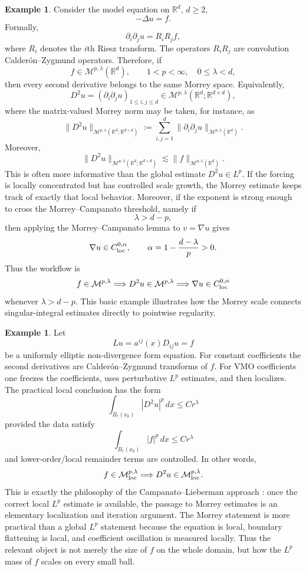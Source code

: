 \documentclass[11pt]{article}
\theoremstyle{definition}
\newtheorem{example}[theorem]{Example}
\newcommand{\R}{\mathbb R}
\begin{document}
\begin{example}\label{ex:poisson-morrey-cz}
Consider the model equation on $\R^d$, $d\ge2$,
\[
        -\Delta u=f .
\]
Formally,
\[
        \partial_i\partial_j u = R_iR_j f,
\]
where $R_i$ denotes the $i$th Riesz transform.  The operators $R_iR_j$ are convolution Calder\'on--Zygmund operators.  Therefore, if
\[
        f\in \mathcal M^{p,\lambda}(\R^d),
        \qquad 1<p<\infty,\quad 0\le\lambda<d,
\]
then every second derivative belongs to the same Morrey space.  Equivalently,
\[
        D^2u=(\partial_i\partial_j u)_{1\le i,j\le d}
        \in \mathcal M^{p,\lambda}(\R^d;\R^{d\times d}),
\]
where the matrix-valued Morrey norm may be taken, for instance, as
\[
        \|D^2u\|_{\mathcal M^{p,\lambda}(\R^d;\R^{d\times d})}
        :=
        \sum_{i,j=1}^d
        \|\partial_i\partial_j u\|_{\mathcal M^{p,\lambda}(\R^d)} .
\]
Moreover,
\[
        \|D^2u\|_{\mathcal M^{p,\lambda}(\R^d;\R^{d\times d})}
        \lesssim
        \|f\|_{\mathcal M^{p,\lambda}(\R^d)} .
\]
This is often more informative than the global estimate $D^2u\in L^p$.  If the forcing is locally concentrated but has controlled scale growth, the Morrey estimate keeps track of exactly that local behavior.  Moreover, if the exponent is strong enough to cross the Morrey--Campanato threshold, namely if
\[
        \lambda>d-p,
\]
then applying the Morrey--Campanato lemma to $v=\nabla u$ gives
\[
        \nabla u\in C^{0,\alpha}_{\rm loc},
        \qquad
        \alpha=1-\frac{d-\lambda}{p}>0.
\]
Thus the workflow is
\[
        f\in \mathcal M^{p,\lambda}
        \Longrightarrow
        D^2u\in \mathcal M^{p,\lambda}
        \Longrightarrow
        \nabla u\in C^{0,\alpha}_{\rm loc}
\]
whenever $\lambda>d-p$.  This basic example illustrates how the Morrey scale connects singular-integral estimates directly to pointwise regularity.
\end{example}

\begin{example}\label{ex:vmo-nondivergence-morrey}
Let
\[
        Lu=a^{ij}(x)D_{ij}u=f
\]
be a uniformly elliptic non-divergence form equation.  For constant coefficients the second derivatives are Calder\'on--Zygmund transforms of $f$.  For VMO coefficients one freezes the coefficients, uses perturbative $L^p$ estimates, and then localizes.  The practical local conclusion has the form
\[
        \int_{B_r(x_0)} |D^2u|^p\,dx
        \le
        C r^\lambda
\]
provided the data satisfy
\[
        \int_{B_r(x_0)} |f|^p\,dx\le C r^\lambda
\]
and lower-order/local remainder terms are controlled.  In other words,
\[
        f\in \mathcal M^{p,\lambda}_{\rm loc}
        \Longrightarrow
        D^2u\in \mathcal M^{p,\lambda}_{\rm loc}.
\]
This is exactly the philosophy of the Campanato--Lieberman approach \cite{Lieberman2003}: once the correct local $L^p$ estimate is available, the passage to Morrey estimates is an elementary localization and iteration argument.  The Morrey statement is more practical than a global $L^p$ statement because the equation is local, boundary flattening is local, and coefficient oscillation is measured locally.  Thus the relevant object is not merely the size of $f$ on the whole domain, but how the $L^p$ mass of $f$ scales on every small ball.
\end{example}
\end{document}

